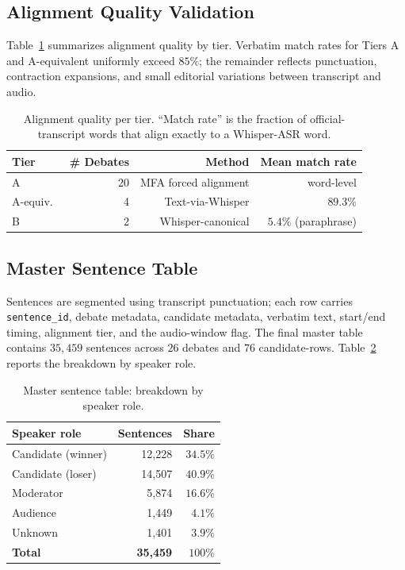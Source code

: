 \documentclass[journal]{IEEEtran}
\begin{document}
\subsection{Alignment Quality Validation}
Table~\ref{tab:alignquality} summarizes alignment quality by tier.
Verbatim match rates for Tiers A and A-equivalent uniformly exceed
$85\%$; the remainder reflects punctuation, contraction expansions,
and small editorial variations between transcript and audio.

\begin{table}[t]
\caption{Alignment quality per tier. ``Match rate'' is the fraction of
official-transcript words that align exactly to a Whisper-ASR word.}
\label{tab:alignquality}
\centering
\begin{tabular}{lrrr}
\toprule
Tier & \# Debates & Method & Mean match rate \\
\midrule
A         & 20 & MFA forced alignment      & word-level \\
A-equiv.\ & 4  & Text-via-Whisper          & $89.3\%$ \\
B         & 2  & Whisper-canonical         & $5.4\%$ (paraphrase) \\
\bottomrule
\end{tabular}
\end{table}

\subsection{Master Sentence Table}
Sentences are segmented using transcript punctuation; each row carries
\texttt{sentence\_id}, debate metadata, candidate metadata,
verbatim text, start/end timing, alignment tier, and
the audio-window flag. The final master table contains $35{,}459$
sentences across $26$ debates and $76$ candidate-rows.
Table~\ref{tab:corpus_role} reports the breakdown by speaker role.

\begin{table}[t]
\caption{Master sentence table: breakdown by speaker role.}
\label{tab:corpus_role}
\centering
\begin{tabular}{lrr}
\toprule
Speaker role & Sentences & Share \\
\midrule
Candidate (winner)    & 12{,}228 & $34.5\%$ \\
Candidate (loser)     & 14{,}507 & $40.9\%$ \\
Moderator             & 5{,}874  & $16.6\%$ \\
Audience              & 1{,}449  & $4.1\%$ \\
Unknown               & 1{,}401  & $3.9\%$ \\
\midrule
\textbf{Total}        & \textbf{35{,}459} & $100\%$ \\
\bottomrule
\end{tabular}
\end{table}
\end{document}
